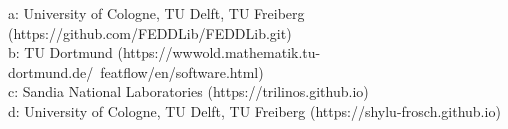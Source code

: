a: University of Cologne, TU Delft, TU Freiberg (https://github.com/FEDDLib/FEDDLib.git)\\
b: TU Dortmund (https://wwwold.mathematik.tu-dortmund.de/~featflow/en/software.html)\\
c: Sandia National Laboratories (https://trilinos.github.io)\\
d: University of Cologne, TU Delft, TU Freiberg (https://shylu-frosch.github.io)\\